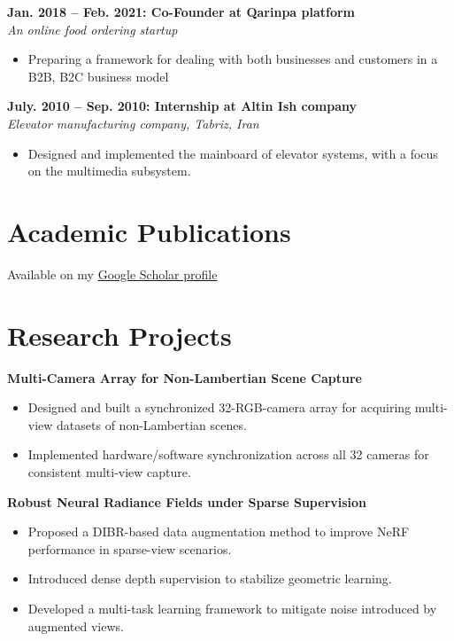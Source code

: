\documentclass[11pt,a4paper]{article}
\newcommand{\blueitem}[1]{\textcolor{subtitleblue}{\textbf{#1}}}
\begin{document}
\blueitem{Jan. 2018 -- Feb. 2021: Co-Founder at Qarinpa platform} \\
\textit{An online food ordering startup}
\begin{itemize}
    \item Preparing a framework for dealing with both businesses and customers in a B2B, B2C business model
\end{itemize}

\blueitem{July. 2010 -- Sep. 2010: Internship at Altin Ish company} \\
\textit{Elevator manufacturing company, Tabriz, Iran}
\begin{itemize}
    \item Designed and implemented the mainboard of elevator systems, with a focus on the multimedia subsystem.
\end{itemize}

\section*{Academic Publications}

Available on my \href{https://scholar.google.com/citations?user=gzbZN8MAAAAJ&hl=en}{Google Scholar profile}

\section*{Research Projects}

\textbf{Multi-Camera Array for Non-Lambertian Scene Capture}
\begin{itemize}
    \item Designed and built a synchronized 32-RGB-camera array for acquiring multi-view datasets of non-Lambertian scenes.
    \item Implemented hardware/software synchronization across all 32 cameras for consistent multi-view capture.
\end{itemize}

\textbf{Robust Neural Radiance Fields under Sparse Supervision}
\begin{itemize}
    \item Proposed a DIBR-based data augmentation method to improve NeRF performance in sparse-view scenarios.
    \item Introduced dense depth supervision to stabilize geometric learning.
    \item Developed a multi-task learning framework to mitigate noise introduced by augmented views.
\end{itemize}
\end{document}
